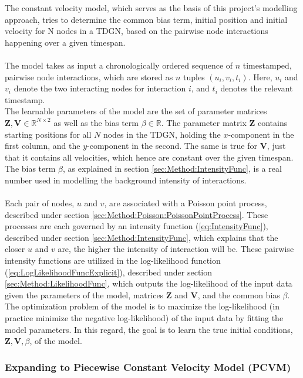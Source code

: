 The constant velocity model, which serves as the basis of this project's modelling approach, tries to determine the common bias term, initial position and initial velocity for N nodes in a TDGN, based on the pairwise node interactions happening over a given timespan.
\\\\
The model takes as input a chronologically ordered sequence of $n$ timestamped, pairwise node interactions, which are stored as $n$ tuples $(u_i, v_i, t_i)$.
Here, $u_i$ and $v_i$ denote the two interacting nodes for interaction $i$, and $t_i$ denotes the relevant timestamp.
\\
The learnable parameters of the model are the set of parameter matrices $\textbf{Z}, \textbf{V} \in \mathbb{R} ^{N \times 2}$ as well as the bias term $\beta \in \mathbb{R}$.
The parameter matrix $\textbf{Z}$ contains starting positions for all $N$ nodes in the TDGN, holding the $x$-component in the first column, and the $y$-component in the second.
The same is true for $\textbf{V}$, just that it contains all velocities, which hence are constant over the given timespan.
The bias term $\beta$, as explained in section \ref{sec:Method:IntensityFunc}, is a real number used in modelling the background intensity of interactions.
\\\\
Each pair of nodes, $u$ and $v$, are associated with a Poisson point process, described under section \ref{sec:Method:Poisson:PoissonPointProcess}.
These processes are each governed by an intensity function (\ref{eq:IntensityFunc}), described under section \ref{sec:Method:IntensityFunc}, which explains that the closer $u$ and $v$ are, the higher the intensity of interaction will be. 
These pairwise intensity functions are utilized in the log-likelihood function (\ref{eq:LogLikelihoodFuncExplicit}), described under section \ref{sec:Method:LikelihoodFunc}, which outputs the log-likelihood of the input data given the parameters of the model, matrices $\textbf{Z}$ and $\textbf{V}$, and the common bias $\beta$.
\\
The optimization problem of the model is to maximize the log-likelihood (in practice minimize the negative log-likelihood) of the input data by fitting the model parameters.
In this regard, the goal is to learn the true initial conditions, $\textbf{Z}, \textbf{V}, \beta$, of the model.


\subsubsection{Expanding to Piecewise Constant Velocity Model (PCVM)}
\label{sec:Method:PiecewiseConstantVModel:PiecewiseConstantVelocityModel}

